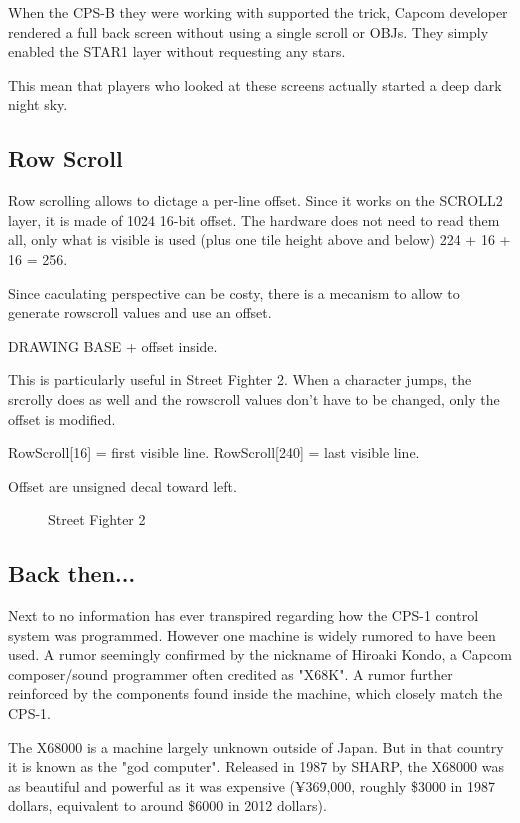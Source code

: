 \begin{trivia}
When the CPS-B they were working with supported the trick, Capcom developer rendered a full back screen without using a single scroll or OBJs. They simply enabled the STAR1 layer without requesting any stars. 

This mean that players who looked at these screens actually started a deep dark night sky.
\end{trivia}

\pagebreak
\subsection{Row Scroll}
Row scrolling allows to dictage a per-line offset. Since it works on the SCROLL2 layer, it is made of 1024 16-bit offset. The hardware does not need to read them all, only what is visible is used (plus one tile height above and below) 224 + 16 + 16 = 256.

Since caculating perspective can be costy, there is a mecanism to allow to generate rowscroll values and use an offset.

DRAWING BASE + offset inside.

This is particularly useful in Street Fighter 2. When a character jumps, the srcrolly does as well and the rowscroll values don't have to be changed, only the offset is modified. 

RowScroll[16] = first visible line.
RowScroll[240] = last visible line. 

Offset are unsigned decal toward left. 
\pagebreak

\begin{figure}[H]
 \caption*{Street Fighter 2}%
 \end{figure}%
\pagebreak

\subsection{Back then...}
Next to no information has ever transpired regarding how the CPS-1 control system was programmed. However one machine is widely rumored to have been used. A rumor seemingly confirmed by the nickname of Hiroaki Kondo, a Capcom composer/sound programmer often credited as "X68K". A rumor further reinforced by the components found inside the machine, which closely match the CPS-1.

The X68000 is a machine largely unknown outside of Japan. But in that country it is known as the "god computer". 
Released in 1987 by SHARP, the X68000 was as beautiful and powerful as it was expensive (¥369,000, roughly \$3000 in 1987 dollars, equivalent to around \$6000 in 2012 dollars).

